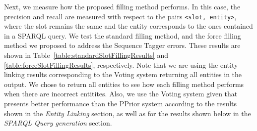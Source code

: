 Next, we measure how the proposed filling method performs. In this case, the precision and recall 
are measured with respect to the pairs \texttt{<slot, entity>}, where the slot remains the same 
and the entity corresponds to the ones contained in a SPARQL query. We test the standard filling 
method, and the force filling method we proposed to address the Sequence Tagger errors. These 
results are shown in Table~\ref{table:standardSlotFillingResults} and \ref{table:forceSlotFillingResults}, 
respectively. Note that we are using the entity linking results corresponding to the Voting system 
returning all entities in the output. We chose to return all entities to see how each filling
method performs when there are incorrect entitites. Also, we use the Voting system given that
presents better performance than the PPrior system according to the results shown in the 
\textit{Entity Linking} section, as well as for the results shown below in the \textit{SPARQL 
Query generation} section.

